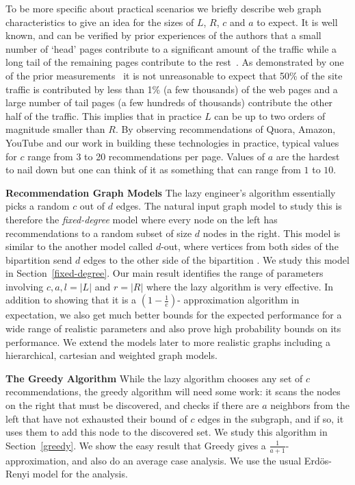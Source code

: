 To be more specific about practical scenarios we briefly describe
web graph characteristics to give an idea for the sizes of $L$,
$R$, $c$ and $a$ to expect. It is well known, and can be verified by
prior experiences of the authors that a small number of `head' pages contribute to a
significant amount of the traffic while a long tail of the remaining
pages contribute to the rest~\cite{HubermanAdamic1999, DuDemmerBrewer2006}. As
demonstrated by one of the prior measurements~\cite{KumarNorrisSun2009}
it is not unreasonable to expect that 50\% of the site traffic is
contributed by less than 1\% (a few thousands) of the web pages and a
large number of tail pages (a few hundreds of thousands) contribute
the other half of the traffic. This implies that in practice $L$ can
be up to two orders of magnitude smaller than $R$.  By observing
recommendations of Quora, Amazon, YouTube and our work in building
these technologies in practice, typical values for $c$ range from 3 to
20 recommendations per page. Values of $a$ are the hardest to nail
down but one can think of it as something that can range from $1$ to
$10$.


{\bf Recommendation Graph Models} The lazy engineer's algorithm
essentially picks a random $c$ out of $d$ edges. The natural input graph model to
study this is therefore the {\em
 fixed-degree} model where every
node on the left has recommendations to a random subset of size $d$
nodes in the right. This model is similar to the another model called
$d$-out, where vertices from both sides of the bipartition send $d$
edges to the other side of the bipartition \cite{FriezePittel2004}. We
study this model in Section~\ref{fixed-degree}. Our main result
identifies the range of parameters involving $c,a,l=|L|$ and $r =|R|$
where the lazy algorithm is very effective. In addition to showing
that it is a $(1-\frac1e)$- approximation algorithm in expectation,
we
 also get much better bounds for the expected performance for a
wide
 range of realistic parameters and also prove high probability
bounds
 on its performance. We extend the models later to more
realistic
 graphs including a hierarchical, cartesian and weighted
graph
 models. \vs


{\bf The Greedy Algorithm} While the lazy algorithm chooses any set of $c$ recommendations, the 
greedy algorithm will need some work: it scans the nodes on the right that must
be discovered, and checks if there are $a$ neighbors from the left that have
not exhausted their bound of $c$ edges in the subgraph, and if so, it uses them to
add this node to the discovered set. We study this algorithm in Section~\ref{greedy}. 
We show the easy result that Greedy gives a $\frac{1}{a+1}$-approximation, 
and also do an average case analysis. We
use the usual Erd\"os-Renyi model\cite{ErdosRenyi59} for the analysis.

